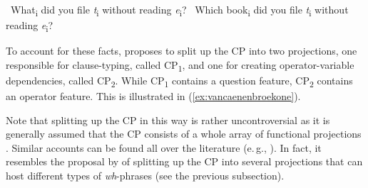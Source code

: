 \begin{exe}
\ex\label{parasiticgapssimplecomplexwh}\begin{xlist}
\ex \textcolor{white}{*}What\textsubscript{i} did you file \textit{t}\textsubscript{i} without reading \textit{e}\textsubscript{i}? \label{parasiticgapssimplecomplexwha}
\ex \textcolor{white}{*}Which book\textsubscript{i} did you file \textit{t}\textsubscript{i} without reading \textit{e}\textsubscript{i}? \label{parasiticgapssimplecomplexwhb}
\end{xlist}
\end{exe}

\noindent To account for these facts, \citet{van2010complex, van2012you} proposes to split up the CP into two projections, one responsible for clause-typing, called CP\textsubscript{1}, and one for creating operator-variable dependencies, called CP\textsubscript{2}. While CP\textsubscript{1} contains a question feature, CP\textsubscript{2} contains an operator feature. This is illustrated in (\ref{ex:vancaenenbroekone}).

\begin{exe}
\ex\label{ex:vancaenenbroekone} 
\end{exe}

\noindent Note that splitting up the CP in this way is rather uncontroversial as it is generally assumed that the CP consists of a whole array of functional projections \citep{rizzi1997fine, rizzi2001position}. Similar accounts can be found all over the literature (e.\,g., \citealt{poletto2002left, zanuttini2003eclamative}). In fact, it resembles the proposal by \citet{aboh2010sa} of splitting up the CP into several projections that can host different types of \textit{wh}-phrases (see the previous subsection).


